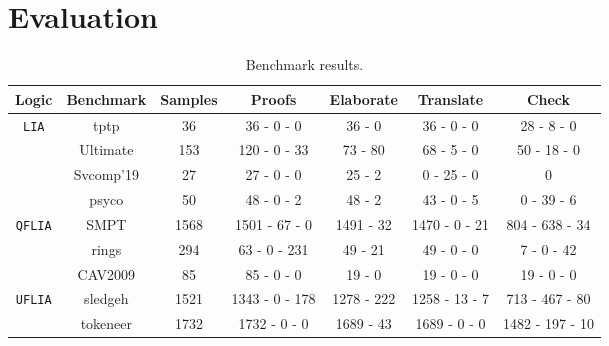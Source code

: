 \section{Evaluation}
\label{sec:evaluation}

\begin{table}[t]
\centering
\caption{Benchmark results.}
\begin{tabular}{|c|c|c|c|c|c|c|}
\hline                                                             %
\textbf{Logic}                & \textbf{Benchmark}  & \textbf{Samples} & \textbf{Proofs}       & \textbf{Elaborate} & \textbf{Translate} & \textbf{Check} \\ \hline
\multirow{4}{*}{\tt{LIA}}     & tptp            & 36               &  36 - 0 - 0           &  36 - 0             & 36 - 0 - 0          & 28 - 8 - 0       \\ \cline{2-7} 
                              & Ultimate        & 153              &  120 - 0 - 33         &  73 - 80            & 68 - 5 - 0          & 50 - 18 - 0      \\ \cline{2-7} 
                              & Svcomp'19      & 27               &  27 - 0 - 0           &  25 - 2             & 0 - 25 - 0          & 0                \\ \cline{2-7} 
                              & psyco           & 50               &  48 - 0 - 2           &  48 - 2             & 43 - 0 - 5          & 0 - 39 - 6       \\ \hline
\multirow{2}{*}{\tt{QFLIA}}   & SMPT            & 1568             &  1501 - 67 - 0        &  1491 - 32          & 1470 - 0 - 21       & 804 - 638 - 34   \\ \cline{2-7}
                              & rings           & 294              &  63 - 0 - 231         &  49 - 21            & 49 - 0 - 0          & 7 - 0 - 42       \\ \cline{2-7} 
                              & CAV2009       & 85               &  85 - 0 - 0           &  19 - 0             & 19 - 0 - 0          & 19 - 0 - 0       \\ \hline
\multirow{2}{*}{\tt{UFLIA}}   & sledgeh    & 1521             &  1343 - 0 - 178       &  1278 - 222         & 1258 - 13 - 7       & 713 - 467 - 80   \\ \cline{2-7} 
                              & tokeneer        & 1732             &  1732 - 0 - 0         & 1689 - 43           & 1689 - 0 - 0        & 1482 - 197 - 10  \\ \hline
\end{tabular}
\label{table:benchmarks-description}
\end{table}

